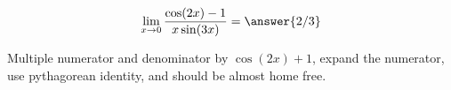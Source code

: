 \documentclass{ximera}
\author{Steven Gubkin}
\begin{document}
\begin{exercise}

\[\lim_{x \to 0} \frac{\cos(2x)-1}{x\sin(3x)} = \answer{2/3}\]
\begin{hint}
	Multiple numerator and denominator by $\cos(2x)+1$, expand the numerator, use pythagorean identity, and should be almost home free.
\end{hint}

\end{exercise}
\end{document}
